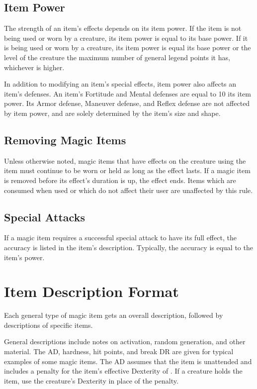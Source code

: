     \subsection{Item Power}\label{Item Power}
        The strength of an item's effects depends on its item power.
        If the item is not being used or worn by a creature, its item power is equal to its base power.
        If it is being used or worn by a creature, its item power is equal its base power or the level of the creature \add the maximum number of general legend points it has, whichever is higher.

        In addition to modifying an item's special effects, item power also affects an item's defenses.
        An item's Fortitude and Mental defenses are equal to 10 \add its item power.
        Its Armor defense, Maneuver defense, and Reflex defense are not affected by item power, and are solely determined by the item's size and shape.

    \subsection{Removing Magic Items}
        Unless otherwise noted, magic items that have effects on the creature using the item must continue to be worn or held as long as the effect lasts.
        If a magic item is removed before its effect's duration is up, the effect ends.
        Items which are consumed when used or which do not affect their user are unaffected by this rule.

    \subsection{Special Attacks}
        If a magic item requires a successful special attack to have its full effect, the accuracy is listed in the item's description.
        Typically, the accuracy is equal to the item's power.

\section{Item Description Format}

    Each general type of magic item gets an overall description, followed by descriptions of specific items.

    General descriptions include notes on activation, random generation, and other material.
    The AD, hardness, hit points, and break DR are given for typical examples of some magic items.
    The AD assumes that the item is unattended and includes a  penalty for the item's effective Dexterity of .
    If a creature holds the item, use the creature's Dexterity in place of the  penalty.


